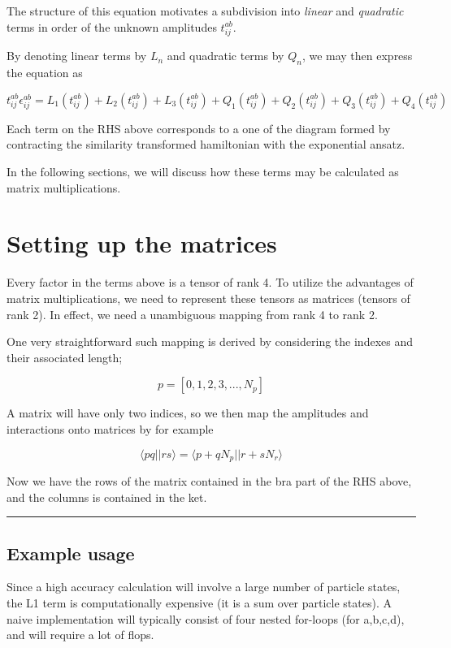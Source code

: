 \documentclass{article}
\begin{document}
    The structure of this equation motivates a subdivision into
\emph{linear} and \emph{quadratic} terms in order of the unknown
amplitudes \(t^{ab}_{ij}\).

By denoting linear terms by \(L_n\) and quadratic terms by \(Q_n\), we
may then express the equation as

    \[ t^{ab}_{ij} \epsilon^{ab}_{ij} = L_1(t^{ab}_{ij}) + L_2(t^{ab}_{ij}) + L_3(t^{ab}_{ij}) + Q_1(t^{ab}_{ij}) + Q_2(t^{ab}_{ij}) + Q_3(t^{ab}_{ij}) + Q_4(t^{ab}_{ij}) \]

    Each term on the RHS above corresponds to a one of the diagram formed by
contracting the similarity transformed hamiltonian with the exponential
ansatz.

In the following sections, we will discuss how these terms may be
calculated as matrix multiplications.

    \section{Setting up the matrices}\label{setting-up-the-matrices}

Every factor in the terms above is a tensor of rank 4. To utilize the
advantages of matrix multiplications, we need to represent these tensors
as matrices (tensors of rank 2). In effect, we need a unambiguous
mapping from rank 4 to rank 2.

One very straightforward such mapping is derived by considering the
indexes and their associated length;

\[ p = [0,1,2,3, ..., N_p] \]

A matrix will have only two indices, so we then map the amplitudes and
interactions onto matrices by for example

\[ \langle pq || rs \rangle = \langle p + q N_p || r + s  N_r \rangle \]

Now we have the rows of the matrix contained in the bra part of the RHS
above, and the columns is contained in the ket.

\begin{center}\rule{0.5\linewidth}{\linethickness}\end{center}

\subsection{Example usage}\label{example-usage}

Since a high accuracy calculation will involve a large number of
particle states, the L1 term is computationally expensive (it is a sum
over particle states). A naive implementation will typically consist of
four nested for-loops (for a,b,c,d), and will require a lot of flops.
\end{document}
